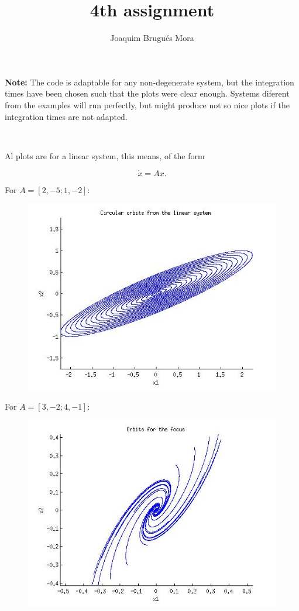 \documentclass[twoside]{article}
\begin{document}
\title{4th assignment}
\author{Joaquim Brugués Mora}
\maketitle

{\bf Note:} The code is adaptable for any non-degenerate system, but the integration times have been chosen such that the plots were clear enough. Systems diferent from the examples will run perfectly, but might produce not so nice plots if the integration times are not adapted.

\

Al plots are for a linear system, this means, of the form

$$\dot{x} = A x .$$

For $A = [2,-5;1,-2]$:

\begin{figure}[!ht]
\centering
\includegraphics[scale=0.6]{circular.jpg}
\end{figure}

\newpage

For $A = [3,-2;4,-1]$:

\begin{figure}[!ht]
\centering
\includegraphics[scale=0.6]{spiral.jpg}
\end{figure}
\end{document}
